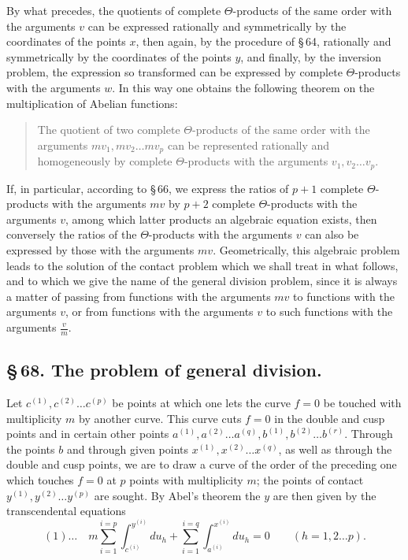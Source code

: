 \documentclass[10pt]{article}
\begin{document}
By what precedes, the quotients of complete \(\Theta\)-products of the same order with the arguments \(v\) can be expressed rationally and symmetrically by the coordinates of the points \(x\), then again, by the procedure of \S\,64, rationally and symmetrically by the coordinates of the points \(y\), and finally, by the inversion problem, the expression so transformed can be expressed by complete \(\Theta\)-products with the arguments \(w\). In this way one obtains the following theorem on the multiplication of Abelian functions:

\begin{quote}
The quotient of two complete \(\Theta\)-products of the same order with the arguments \(mv_1,mv_2\ldots mv_p\) can be represented rationally and homogeneously by complete \(\Theta\)-products with the arguments \(v_1,v_2\ldots v_p\).
\end{quote}

If, in particular, according to \S\,66, we express the ratios of \(p+1\) complete \(\Theta\)-products with the arguments \(mv\) by \(p+2\) complete \(\Theta\)-products with the arguments \(v\), among which latter products an algebraic equation exists, then conversely the ratios of the \(\Theta\)-products with the arguments \(v\) can also be expressed by those with the arguments \(mv\). Geometrically, this algebraic problem leads to the solution of the contact problem which we shall treat in what follows, and to which we give the name of the general division problem, since it is always a matter of passing from functions with the arguments \(mv\) to functions with the arguments \(v\), or from functions with the arguments \(v\) to such functions with the arguments \(\frac{v}{m}\).

\subsection*{\S\,68. The problem of general division.}

Let \(c^{(1)},c^{(2)}\ldots c^{(p)}\) be points at which one lets the curve \(f=0\) be touched with multiplicity \(m\) by another curve. This curve cuts \(f=0\) in the double and cusp points and in certain other points \(a^{(1)},a^{(2)}\ldots a^{(q)},b^{(1)},b^{(2)}\ldots b^{(r)}\). Through the points \(b\) and through given points \(x^{(1)},x^{(2)}\ldots x^{(q)}\), as well as through the double and cusp points, we are to draw a curve of the order of the preceding one which touches \(f=0\) at \(p\) points with multiplicity \(m\); the points of contact \(y^{(1)},y^{(2)}\ldots y^{(p)}\) are sought. By Abel's theorem the \(y\) are then given by the transcendental equations
\[
(1)\ldots\quad
m\sum_{i=1}^{i=p}\int_{c^{(i)}}^{y^{(i)}}du_h+
\sum_{i=1}^{i=q}\int_{a^{(i)}}^{x^{(i)}}du_h=0
\qquad(h=1,2\ldots p).
\]
\end{document}
